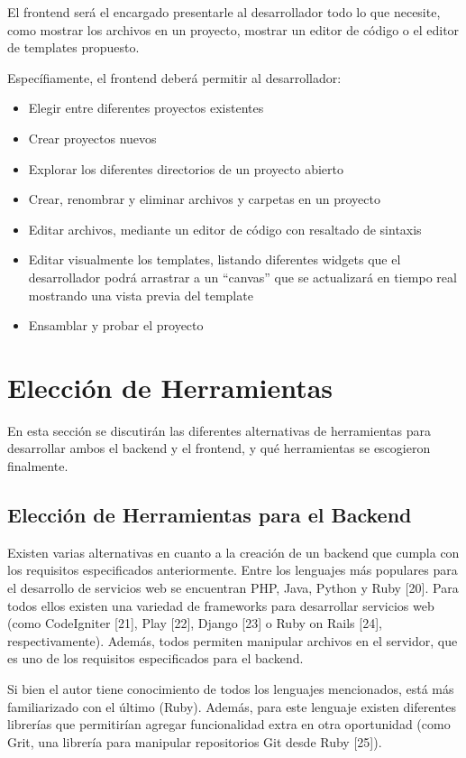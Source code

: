 \documentclass[12pt,spanish,letter]{report}
\begin{document}
El frontend será el encargado presentarle al desarrollador todo lo que
necesite, como mostrar los archivos en un proyecto, mostrar un editor de
código o el editor de templates propuesto.

Específiamente, el frontend deberá permitir al desarrollador:

\begin{itemize}
\item
  Elegir entre diferentes proyectos existentes
\item
  Crear proyectos nuevos
\item
  Explorar los diferentes directorios de un proyecto abierto
\item
  Crear, renombrar y eliminar archivos y carpetas en un proyecto
\item
  Editar archivos, mediante un editor de código con resaltado de
  sintaxis
\item
  Editar visualmente los templates, listando diferentes widgets que el
  desarrollador podrá arrastrar a un ``canvas'' que se actualizará en
  tiempo real mostrando una vista previa del template
\item
  Ensamblar y probar el proyecto
\end{itemize}

\section{Elección de Herramientas}

En esta sección se discutirán las diferentes alternativas de
herramientas para desarrollar ambos el backend y el frontend, y qué
herramientas se escogieron finalmente.

\subsection{Elección de Herramientas para el Backend}

Existen varias alternativas en cuanto a la creación de un backend que
cumpla con los requisitos especificados anteriormente. Entre los
lenguajes más populares para el desarrollo de servicios web se
encuentran PHP, Java, Python y Ruby {[}20{]}. Para todos ellos existen
una variedad de frameworks para desarrollar servicios web (como
CodeIgniter {[}21{]}, Play {[}22{]}, Django {[}23{]} o Ruby on Rails
{[}24{]}, respectivamente). Además, todos permiten manipular archivos en
el servidor, que es uno de los requisitos especificados para el backend.

Si bien el autor tiene conocimiento de todos los lenguajes mencionados,
está más familiarizado con el último (Ruby). Además, para este lenguaje
existen diferentes librerías que permitirían agregar funcionalidad extra
en otra oportunidad (como Grit, una librería para manipular repositorios
Git desde Ruby {[}25{]}).
\end{document}
